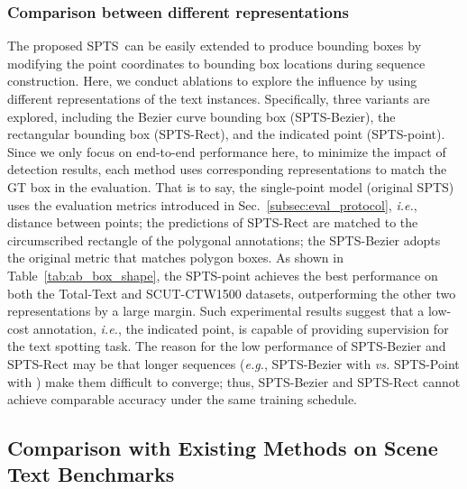 \documentclass[sigconf]{acmart}
\newcommand{\methodName}{SPTS}
\begin{document}
\subsubsection{Comparison between different representations}
\label{sec_rect_bezier}
The proposed \methodName\ can be easily extended to produce bounding boxes by modifying the point coordinates to bounding box locations during sequence construction. Here, we conduct ablations to explore the influence by using different representations of the text instances. Specifically, three variants are explored, including the Bezier curve bounding box (\methodName-Bezier), the rectangular bounding box (SPTS-Rect), and the indicated point (\methodName-point). Since we only focus on end-to-end performance here, to minimize the impact of detection results, each method uses corresponding representations to match the GT box in the evaluation. That is to say, the single-point model (original \methodName) uses the evaluation metrics introduced in Sec.~\ref{subsec:eval_protocol}, \emph{i.e.}, distance between points; the predictions of \methodName-Rect are matched to the circumscribed rectangle of the polygonal annotations; the \methodName-Bezier adopts the original metric that matches polygon boxes. As shown in Table~\ref{tab:ab_box_shape}, the \methodName-point achieves the best performance on both the Total-Text and SCUT-CTW1500 datasets, outperforming the other two representations by a large margin. Such experimental results suggest that a low-cost annotation, \emph{i.e.}, the indicated point, is capable of providing supervision for the text spotting task. The reason for the low performance of \methodName-Bezier and \methodName-Rect may be that longer sequences (\emph{e.g.}, \methodName-Bezier with  \emph{vs.} \methodName-Point with ) make them difficult to converge; thus, \methodName-Bezier and \methodName-Rect cannot achieve comparable accuracy under the same training schedule.

\subsection{Comparison with Existing Methods on Scene Text Benchmarks}
\end{document}
